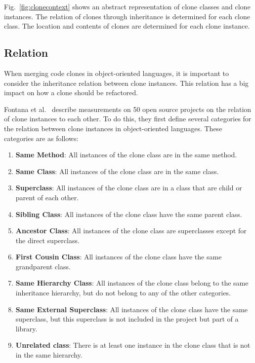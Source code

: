 \documentclass[runningheads]{llncs}
\begin{document}
Fig.~\ref{fig:clonecontext} shows an abstract representation of clone classes and clone instances. The relation of clones through inheritance is determined for each clone class. The location and contents of clones are determined for each clone instance.

\subsection{Relation}\label{sec:setuprelation}
When merging code clones in object-oriented languages, it is important to consider the inheritance relation between clone instances. This relation has a big impact on how a clone should be refactored.

Fontana et al.~\cite{fontana2015duplicated} describe measurements on 50 open source projects on the relation of clone instances to each other. To do this, they first define several categories for the relation between clone instances in object-oriented languages. These categories are as follows:
\begin{enumerate}
  \item \textbf{Same Method}: All instances of the clone class are in the same method.
  \item \textbf{Same Class}: All instances of the clone class are in the same class.
  \item \textbf{Superclass}: All instances of the clone class are in a class that are child or parent of each other.
  \item \textbf{Sibling Class}: All instances of the clone class have the same parent class.
    \item \textbf{Ancestor Class}: All instances of the clone class are superclasses except for the direct superclass.
  \item \textbf{First Cousin Class}: All instances of the clone class have the same grandparent class.
\item \textbf{Same Hierarchy Class}: All instances of the clone class belong to the same inheritance hierarchy, but do not belong to any of the other categories.
\item \textbf{Same External Superclass}: All instances of the clone class have the same superclass, but this superclass is not included in the project but part of a library.
\item \textbf{Unrelated class}: There is at least one instance in the clone class that is not in the same hierarchy.
\end{enumerate}
\end{document}
